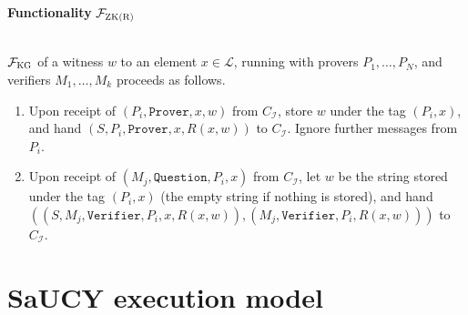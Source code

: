 \documentclass[a4paper]{article}
\newcommand{\F}{\mathcal{F}}
\begin{document}
\begin{framed}
    \centerline{\textbf{Functionality} $\F_{\textsc{ZK(R)}}$}
    \ \\
    \noindent $\F_{\textsc{KG}}$ of a witness $w$ to an element $x \in \mathcal{L}$, running with provers $P_1, \ldots, P_N$, and verifiers $M_1, \ldots, M_k$ proceeds as follows.
    
    \begin{enumerate}
        \item Upon receipt of $(P_i, \texttt{Prover}, x, w)$ from $C_\mathcal{I}$, store $w$ under the tag $(P_i, x)$, and hand $(S, P_i, \texttt{Prover}, x, R(x, w))$ to $C_\mathcal{I}$. Ignore further messages from $P_i$.
        \item Upon receipt of $(M_j, \texttt{Question}, P_i, x)$ from $C_\mathcal{I}$, let $w$ be the string stored under the tag $(P_i, x)$ (the empty string if nothing is stored), and hand $((S, M_j, \texttt{Verifier}, P_i, x, R(x, w)), (M_j, \texttt{Verifier}, P_i, R(x, w)))$ to $C_\mathcal{I}$.
    \end{enumerate}
\end{framed}


\section{SaUCY execution model}




\end{document}
